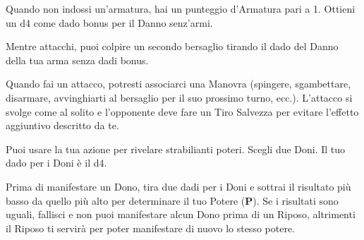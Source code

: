 \documentclass[itdr]{subfiles}
\begin{document}
\vfill
{}\featmt\feathp
Quando non indossi un'armatura, hai un punteggio d’Armatura pari a 1. Ottieni un d4 come dado bonus per il Danno senz’armi.

\clearpage

\vfill
{}\feathp
Mentre attacchi, puoi colpire un secondo bersaglio tirando il dado del Danno della tua arma senza dadi bonus.

\feathp
Quando fai un attacco, potresti associarci una Manovra (spingere, sgambettare, disarmare, avvinghiarti al bersaglio per il suo prossimo turno, ecc.). L’attacco si svolge come al solito e l’opponente deve fare un Tiro Salvezza per evitare l’effetto aggiuntivo descritto da te.

\featmt
Puoi usare la tua azione per rivelare strabilianti poteri. Scegli due Doni. Il tuo dado per i Doni è il d4.

Prima di manifestare un Dono, tira due dadi per i Doni e sottrai il risultato più basso da quello più alto per determinare il tuo Potere (\textbf{P}). Se i risultati sono uguali, fallisci e non puoi manifestare alcun Dono prima di un Riposo, altrimenti il Riposo ti servirà per poter manifestare di nuovo lo stesso potere.
\end{document}
